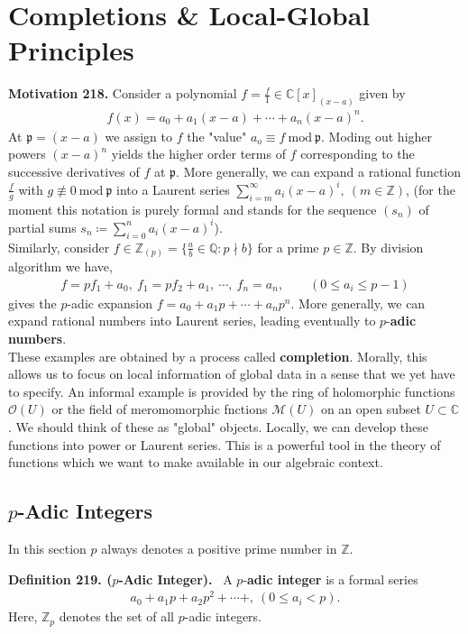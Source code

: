 \documentclass[12pt,a4paper,footinclude=true,headinclude=true]{scrbook} %
\newenvironment{definition}[2][Definition]
    { \begin{mdframed}[backgroundcolor=gray!20] \textbf{#1 #2.}\ }
    {  \end{mdframed}}
\newenvironment{motivation}[2][Motivation]
    { \begin{mdframed}[backgroundcolor=red!20] \textbf{#1 #2.} }
    {  \end{mdframed}}
\begin{document}
\chapter{Completions \& Local-Global Principles}
\begin{motivation}{218}
    Consider a polynomial $f=\frac{f}{1}\in\mathbb{C}[x]_{(x-a)}$ given by 
    \begin{align*}
        f(x)=a_0+a_1(x-a)+\cdots+a_n(x-a)^n.
    \end{align*}
    At $\mathfrak{p}=(x-a)$ we assign to $f$ the "value" $a_o\equiv f\ \mathrm{mod}\ \mathfrak{p}$. Moding out higher powers $(x-a)^n$ yields the higher order terms of $f$ corresponding to the successive derivatives of $f$ at $\mathfrak{p}$. More generally, we can expand a rational function $\frac{f}{g}$ with $g\not\equiv0\ \mathrm{mod}\ \mathfrak{p}$ into a Laurent series $\sum_{i=m}^\infty a_i(x-a)^i,\ (m\in\mathbb{Z})$, (for the moment this notation is purely formal and stands for the sequence $(s_n)$ of partial sums $s_n\coloneqq\sum_{i=0}^na_i(x-a)^i$).\\
    Similarly, consider $f\in\mathbb{Z}_{(p)}=\{\frac{a}{b}\in\mathbb{Q}:p\nmid b\}$ for a prime $p\in\mathbb{Z}$. By division algorithm we have,  
    \begin{align*}
        f=pf_1+a_0,\ f_1=pf_2+a_1,\ \cdots,\ f_n=a_n,\qquad (0\leq a_i\leq p-1)
    \end{align*}
    gives the $p$-adic expansion $f=a_0+a_1p+\cdots+a_np^n$. More generally, we can expand rational numbers into Laurent series, leading eventually to $p$-\textbf{adic numbers}.\\
    These examples are obtained by a process called \textbf{completion}. Morally, this allows us to focus on local information of global data in a sense that we yet have to specify. An informal example is provided by the ring of holomorphic functions $\mathcal{O}(U)$ or the field of meromomorphic fnctions $\mathcal{M}(U)$ on an open subset $U\subset\mathbb{C}$. We should think of these as "global" objects. Locally, we can develop these functions into power or Laurent series. This is a powerful tool in the theory of functions which we want to make available in our algebraic context.
\end{motivation}

\section{$p$-Adic Integers}
In this section $p$ always denotes a positive prime number in $\mathbb{Z}$.
\begin{definition}{219. ($p$-Adic Integer)}
    \newline A $p$-\textbf{adic integer} is a formal series 
    \begin{align*}
        a_0+a_1p+a_2p^2+\cdots+,\ (0\leq a_i<p).
    \end{align*}
    Here, $\mathbb{Z}_p$ denotes the set of all $p$-adic integers.
\end{definition}
\end{document}
